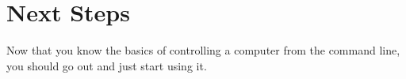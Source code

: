 \chapter{Next Steps}

Now that you know the basics of controlling a computer from the command line, you
should go out and just start using it.
